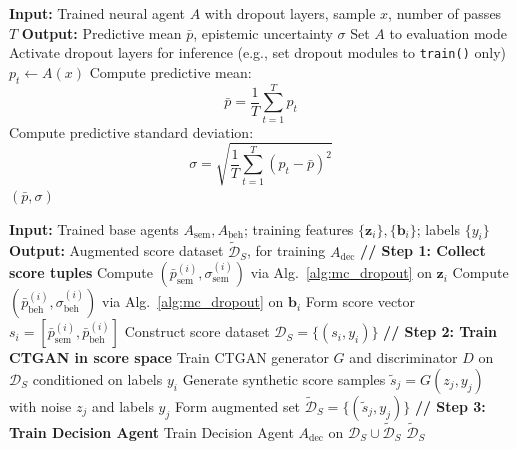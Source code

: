 \documentclass[3p]{elsarticle}
\begin{document}
\begin{algorithm}[t]
\caption{MC Dropout Uncertainty Estimation for a Neural Agent}
\label{alg:mc_dropout}
\begin{algorithmic}[1]
    \State \textbf{Input:} Trained neural agent $A$ with dropout layers, sample $x$, number of passes $T$
    \State \textbf{Output:} Predictive mean $\bar{p}$, epistemic uncertainty $\sigma$
    \vspace{1mm}
    \State Set $A$ to evaluation mode
    \State Activate dropout layers for inference (e.g., set dropout modules to \texttt{train()} only)
        \State $p_t \gets A(x)$ 
    \EndFor
    \State Compute predictive mean:
    \[
        \bar{p} = \frac{1}{T}\sum_{t=1}^{T} p_t
    \]
    \State Compute predictive standard deviation:
    \[
        \sigma = \sqrt{\frac{1}{T}\sum_{t=1}^{T} (p_t - \bar{p})^2}
    \]
    \State \Return $(\bar{p}, \sigma)$
\end{algorithmic}
\end{algorithm}



\begin{algorithm}[t]
\caption{Score-Level CTGAN Augmentation for Decision Agent Training}
\label{alg:ctgan_scores}
\begin{algorithmic}[1]
    \State \textbf{Input:} Trained base agents $A_{\text{sem}}, A_{\text{beh}}$; training features $\{\mathbf{z}_i\}, \{\mathbf{b}_i\}$; labels $\{y_i\}$
    \State \textbf{Output:} Augmented score dataset $\tilde{\mathcal{D}}_S$, for training $A_{\text{dec}}$
    \vspace{1mm}
    \Statex \textbf{// Step 1: Collect score tuples}
        \State Compute $(\bar{p}_{\text{sem}}^{(i)}, \sigma_{\text{sem}}^{(i)})$ via Alg.~\ref{alg:mc_dropout} on $\mathbf{z}_i$
        \State Compute $(\bar{p}_{\text{beh}}^{(i)}, \sigma_{\text{beh}}^{(i)})$ via Alg.~\ref{alg:mc_dropout} on $\mathbf{b}_i$
        \State Form score vector $s_i = [\bar{p}_{\text{sem}}^{(i)}, \bar{p}_{\text{beh}}^{(i)}]$
    \EndFor
    \State Construct score dataset $\mathcal{D}_S = \{(s_i, y_i)\}$
    \vspace{1mm}
    \Statex \textbf{// Step 2: Train CTGAN in score space}
    \State Train CTGAN generator $G$ and discriminator $D$ on $\mathcal{D}_S$ conditioned on labels $y_i$
    \State Generate synthetic score samples $\tilde{s}_j = G(z_j, y_j)$ with noise $z_j$ and labels $y_j$
    \State Form augmented set $\tilde{\mathcal{D}}_S = \{(\tilde{s}_j, y_j)\}$
    \Statex \textbf{// Step 3: Train Decision Agent}
    \State Train Decision Agent $A_{\text{dec}}$ on $\mathcal{D}_S \cup \tilde{\mathcal{D}}_S$
    \State \Return $\tilde{\mathcal{D}}_S$
\end{algorithmic}
\end{algorithm}
\end{document}
